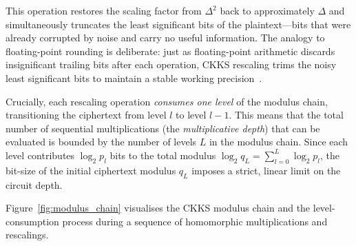 This operation restores the scaling factor from $\Delta^2$ back to approximately $\Delta$ and simultaneously truncates the least significant bits of the plaintext---bits that were already corrupted by noise and carry no useful information. The analogy to floating-point rounding is deliberate: just as floating-point arithmetic discards insignificant trailing bits after each operation, CKKS rescaling trims the noisy least significant bits to maintain a stable working precision~\cite{cheon2017homomorphic}.

Crucially, each rescaling operation \emph{consumes one level} of the modulus chain, transitioning the ciphertext from level $l$ to level $l-1$. This means that the total number of sequential multiplications (the \emph{multiplicative depth}) that can be evaluated is bounded by the number of levels $L$ in the modulus chain. Since each level contributes $\log_2 p_l$ bits to the total modulus $\log_2 q_L = \sum_{l=0}^{L} \log_2 p_l$, the bit-size of the initial ciphertext modulus $q_L$ imposes a strict, linear limit on the circuit depth.

Figure~\ref{fig:modulus_chain} visualises the CKKS modulus chain and the level-consumption process during a sequence of homomorphic multiplications and rescalings.

